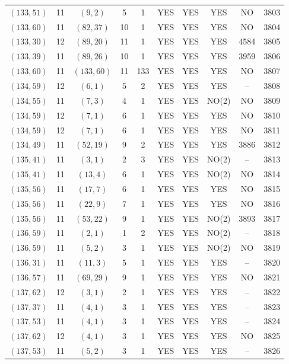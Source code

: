 \begin{longtable}{|c|c|c|c|c|c|c|c|c|c|}
$(133, 51)$ & 11 & $(9, 2)$ & 5 & 1 & YES & YES & YES & NO & 3803\\
$(133, 60)$ & 11 & $(82, 37)$ & 10 & 1 & YES & YES & YES & NO & 3804\\
$(133, 30)$ & 12 & $(89, 20)$ & 11 & 1 & YES & YES & YES & 4584 & 3805\\
$(133, 39)$ & 11 & $(89, 26)$ & 10 & 1 & YES & YES & YES & 3959 & 3806\\
$(133, 60)$ & 11 & $(133, 60)$ & 11 & 133 & YES & YES & YES & NO & 3807\\
$(134, 59)$ & 12 & $(6, 1)$ & 5 & 2 & YES & YES & YES & -- & 3808\\
$(134, 55)$ & 11 & $(7, 3)$ & 4 & 1 & YES & YES & NO(2) & NO & 3809\\
$(134, 59)$ & 12 & $(7, 1)$ & 6 & 1 & YES & YES & YES & NO & 3810\\
$(134, 59)$ & 12 & $(7, 1)$ & 6 & 1 & YES & YES & YES & NO & 3811\\
$(134, 49)$ & 11 & $(52, 19)$ & 9 & 2 & YES & YES & YES & 3886 & 3812\\
$(135, 41)$ & 11 & $(3, 1)$ & 2 & 3 & YES & YES & NO(2) & -- & 3813\\
$(135, 41)$ & 11 & $(13, 4)$ & 6 & 1 & YES & YES & NO(2) & NO & 3814\\
$(135, 56)$ & 11 & $(17, 7)$ & 6 & 1 & YES & YES & YES & NO & 3815\\
$(135, 56)$ & 11 & $(22, 9)$ & 7 & 1 & YES & YES & YES & NO & 3816\\
$(135, 56)$ & 11 & $(53, 22)$ & 9 & 1 & YES & YES & NO(2) & 3893 & 3817\\
$(136, 59)$ & 11 & $(2, 1)$ & 1 & 2 & YES & YES & NO(2) & -- & 3818\\
$(136, 59)$ & 11 & $(5, 2)$ & 3 & 1 & YES & YES & NO(2) & NO & 3819\\
$(136, 31)$ & 11 & $(11, 3)$ & 5 & 1 & YES & YES & YES & -- & 3820\\
$(136, 57)$ & 11 & $(69, 29)$ & 9 & 1 & YES & YES & YES & NO & 3821\\
$(137, 62)$ & 12 & $(3, 1)$ & 2 & 1 & YES & YES & YES & -- & 3822\\
$(137, 37)$ & 11 & $(4, 1)$ & 3 & 1 & YES & YES & YES & -- & 3823\\
$(137, 53)$ & 11 & $(4, 1)$ & 3 & 1 & YES & YES & YES & -- & 3824\\
$(137, 62)$ & 12 & $(4, 1)$ & 3 & 1 & YES & YES & YES & NO & 3825\\
$(137, 53)$ & 11 & $(5, 2)$ & 3 & 1 & YES & YES & YES & -- & 3826\\

\end{longtable}
